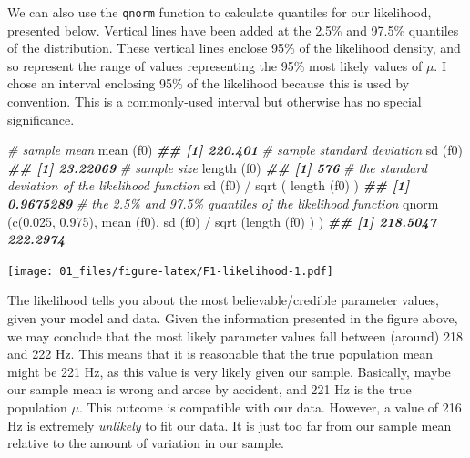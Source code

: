 \documentclass[
]{book}
\newenvironment{Shaded}{\begin{snugshade}}{\end{snugshade}}
\newcommand{\CommentTok}[1]{\textcolor[rgb]{0.56,0.35,0.01}{\textit{#1}}}
\newcommand{\DocumentationTok}[1]{\textcolor[rgb]{0.56,0.35,0.01}{\textbf{\textit{#1}}}}
\newcommand{\FloatTok}[1]{\textcolor[rgb]{0.00,0.00,0.81}{#1}}
\newcommand{\FunctionTok}[1]{\textcolor[rgb]{0.00,0.00,0.00}{#1}}
\newcommand{\NormalTok}[1]{#1}
\newcommand{\SpecialCharTok}[1]{\textcolor[rgb]{0.00,0.00,0.00}{#1}}
\begin{document}
We can also use the \texttt{qnorm} function to calculate quantiles for our likelihood, presented below. Vertical lines have been added at the 2.5\% and 97.5\% quantiles of the distribution. These vertical lines enclose 95\% of the likelihood density, and so represent the range of values representing the 95\% most likely values of \(\mu\). I chose an interval enclosing 95\% of the likelihood because this is used by convention. This is a commonly-used interval but otherwise has no special significance.

\begin{Shaded}
\begin{Highlighting}[]
\CommentTok{\# sample mean}
\FunctionTok{mean}\NormalTok{ (f0)   }
\DocumentationTok{\#\# [1] 220.401}
\CommentTok{\# sample standard deviation}
\FunctionTok{sd}\NormalTok{ (f0)     }
\DocumentationTok{\#\# [1] 23.22069}
\CommentTok{\# sample size}
\FunctionTok{length}\NormalTok{ (f0)  }
\DocumentationTok{\#\# [1] 576}
\CommentTok{\# the standard deviation of the likelihood function}
\FunctionTok{sd}\NormalTok{ (f0) }\SpecialCharTok{/} \FunctionTok{sqrt}\NormalTok{ ( }\FunctionTok{length}\NormalTok{ (f0) ) }
\DocumentationTok{\#\# [1] 0.9675289}
\CommentTok{\# the 2.5\% and 97.5\% quantiles of the likelihood function}
\FunctionTok{qnorm}\NormalTok{ (}\FunctionTok{c}\NormalTok{(}\FloatTok{0.025}\NormalTok{, }\FloatTok{0.975}\NormalTok{), }\FunctionTok{mean}\NormalTok{ (f0), }\FunctionTok{sd}\NormalTok{ (f0) }\SpecialCharTok{/} \FunctionTok{sqrt}\NormalTok{ (}\FunctionTok{length}\NormalTok{ (f0) ) )}
\DocumentationTok{\#\# [1] 218.5047 222.2974}
\end{Highlighting}
\end{Shaded}

\texttt{[image: 01\_files/figure-latex/F1-likelihood-1.pdf]}
~

The likelihood tells you about the most believable/credible parameter values, given your model and data. Given the information presented in the figure above, we may conclude that the most likely parameter values fall between (around) 218 and 222 Hz. This means that it is reasonable that the true population mean might be 221 Hz, as this value is very likely given our sample. Basically, maybe our sample mean is wrong and arose by accident, and 221 Hz is the true population \(\mu\). This outcome is compatible with our data. However, a value of 216 Hz is extremely \emph{unlikely} to fit our data. It is just too far from our sample mean relative to the amount of variation in our sample.
\end{document}
